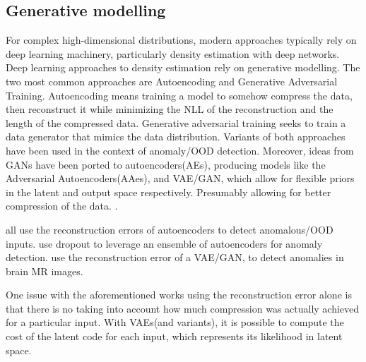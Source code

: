 \documentclass[../main.tex]{subfiles}
\begin{document}
\subsection{Generative modelling}

For complex high-dimensional distributions, modern approaches typically rely on deep learning machinery, particularly density estimation with deep networks. Deep learning approaches to density estimation rely on generative modelling. The two most common approaches are Autoencoding and Generative Adversarial Training. Autoencoding means training a model to somehow compress the data, then reconstruct it while minimizing the NLL of the reconstruction and the length of the compressed data.
Generative adversarial training seeks to train a data generator that mimics the data distribution. Variants of both approaches have been used in the context of anomaly/OOD detection. Moreover, ideas from GANs have been ported to autoencoders(AEs), producing models like the Adversarial Autoencoders(AAes)\citep{makhzani2015adversarial}, and VAE/GAN\cite{larsen2015autoencoding}, which allow for flexible priors in the latent and output space respectively. Presumably allowing for better compression of the data. .


\citet{xu2018unsupervised, an2015variational, borghesi2019anomaly} all use the reconstruction errors of autoencoders to detect anomalous/OOD inputs. 
\citet{chen2017outlier} use dropout to leverage an ensemble of autoencoders for anomaly detection.
\citet{baur2018deep} use the reconstruction error of a VAE/GAN\citep{larsen2015autoencoding}, to detect anomalies in brain MR images.

One issue with the aforementioned works using the reconstruction error alone is that there is no taking into account how much compression was actually achieved for a particular input.
With VAEs(and variants), it is possible to compute the cost of the latent code for each input, which represents its likelihood in latent space. 
\end{document}
